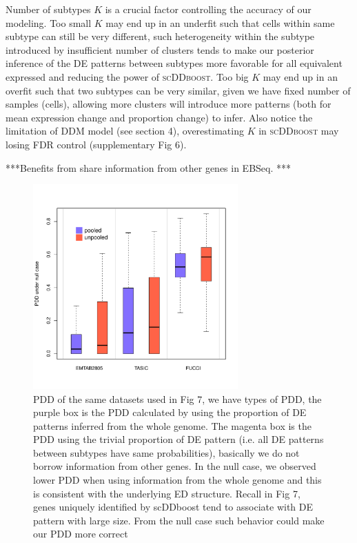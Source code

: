 \documentclass[aoas,preprint]{imsart}
\begin{document}
Number of subtypes $K$ is a crucial factor controlling the accuracy of our modeling. 
Too small $K$ may end up in an underfit such that cells within same subtype can still be very different, such heterogeneity within the subtype introduced by insufficient number of clusters 
tends to make our posterior inference of the DE patterns between subtypes more favorable for all equivalent expressed and reducing the power of \textsc{scDDboost}.
Too big $K$ may end up in an overfit such that two subtypes can be very similar, given we have fixed number of samples (cells), allowing more clusters will introduce more patterns (both for mean expression change and proportion change) to infer. 
Also notice the limitation of DDM model (see section 4), overestimating $K$ in \textsc{scDDboost} may losing FDR control (supplementary Fig 6). 

***Benefits from share information from other genes in EBSeq. ***
\begin{figure}[H]
\includegraphics[width = 0.7\textwidth]{Figs/nullpdd_box.pdf}
 \caption{PDD of the same datasets used in Fig 7, we have types of PDD, the purple box is the PDD calculated by using the proportion of DE patterns inferred from the whole genome.  
 The magenta box is the PDD using the trivial proportion of DE pattern (i.e. all DE patterns between subtypes have same probabilities), basically we do not borrow information from other genes. 
 In the null case, we observed lower PDD when using information from the whole genome and this is consistent with the underlying ED structure. 
 Recall in Fig 7, genes uniquely identified by scDDboost tend to associate with DE pattern with large size. From the null case such behavior could make our PDD more correct}
  \label{fig:8}
\end{figure}
\end{document}
